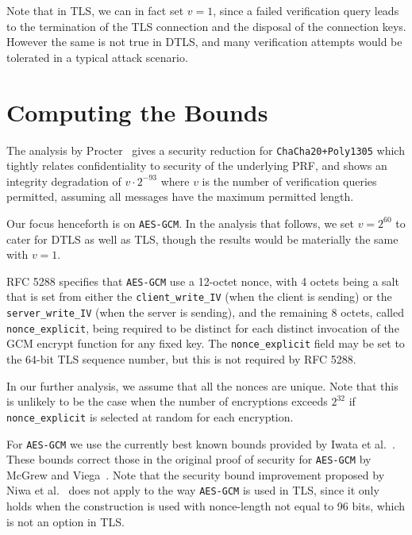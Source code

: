 \documentclass{article}
\begin{document}
Note that in TLS, we can in fact set $v=1$, since a failed verification query leads to the termination of the TLS connection and the disposal of the connection keys. However the same is not true in DTLS, and many verification attempts would be tolerated in a typical attack scenario. 

\section{Computing the Bounds}

The analysis by Procter~\cite{cryptoeprint:2014:613} gives a security reduction for \texttt{ChaCha20+Poly1305} which tightly relates confidentiality to security of the underlying PRF, and shows an integrity degradation of $v \cdot 2^{-93}$ where $v$ is the number of verification queries permitted, assuming all messages have the maximum permitted length.


Our focus henceforth is on \texttt{AES-GCM}. In the analysis that follows, we set $v = 2^{60}$ to cater for DTLS as well as TLS, though the results would be materially the same with $v=1$.

RFC 5288 specifies that \texttt{AES-GCM} use a 12-octet nonce, with 4 octets being a salt that is set from either the \verb|client_write_IV| (when the client is sending) or the \verb|server_write_IV| (when the server is sending), and the remaining 8 octets, called \verb|nonce_explicit|, being required to be distinct for each distinct invocation of the GCM encrypt function for any fixed key. The  \verb|nonce_explicit| field may be set to the 64-bit TLS sequence number, but this is not required by RFC 5288. 

In our further analysis, we assume that all the nonces are unique. Note that this is unlikely to be the case when the number of encryptions exceeds $2^{32}$ if \verb|nonce_explicit| is selected at random for each encryption.

For \texttt{AES-GCM} we use the currently best known bounds provided by Iwata et al.~\cite{GCMLNCS,cryptoeprint:2012:438}. These bounds correct those in the original proof of security for \texttt{AES-GCM} by McGrew and Viega~\cite{DBLP:conf/indocrypt/McGrewV04,DBLP:journals/iacr/McGrewV04}. Note that the security bound improvement proposed by Niwa et al.~\cite{DBLP:conf/fse/NiwaOMI15,DBLP:journals/iacr/NiwaOMI15} does not apply to the way \texttt{AES-GCM} is used in TLS, since it only holds when the construction is used with nonce-length not equal to 96 bits, which is not an option in TLS. 
\end{document}
